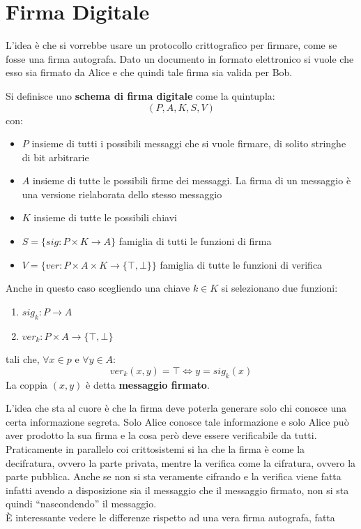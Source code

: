 \documentclass[a4paper,12pt, oneside]{book}
\begin{document}
\section{Firma Digitale}
L'idea è che si vorrebbe usare un protocollo crittografico per firmare, come se
fosse una firma autografa. Dato un documento in formato elettronico si vuole che
esso sia firmato da Alice e che quindi tale firma sia valida per Bob.
\begin{definizione}
  Si definisce uno \textbf{schema di firma digitale} come la quintupla:
  \[(P,A,K,S,V)\]
  con:
  \begin{itemize}
    \item $P$ insieme di tutti i possibili messaggi che si vuole firmare, di
    solito stringhe di bit arbitrarie
    \item $A$ insieme di tutte le possibili firme dei messaggi. La firma di un
    messaggio è una versione rielaborata dello stesso messaggio
    \item $K$ insieme di tutte le possibili chiavi
    \item $S=\{sig:P\times K\to A\}$ famiglia di tutti le funzioni di firma
    \item $V=\{ver:P\times A\times K\to\{\top,\bot\}\}$ famiglia di tutte le
    funzioni di verifica
  \end{itemize}
  Anche in questo caso scegliendo una chiave $k\in K$ si selezionano due
  funzioni:
  \begin{enumerate}
    \item $sig_k:P\to A$
    \item $ver_k:P\times A\to\{\top,\bot\}$
  \end{enumerate}
  tali che, $\forall x\in p$ e $\forall y\in A$:
  \[ver_k(x,y)=\top \iff y=sig_k(x)\]
  La coppia $(x,y)$ è detta \textbf{messaggio firmato}.
\end{definizione}
L'idea che sta al cuore è che la firma deve poterla generare solo chi conosce
una certa informazione segreta. Solo Alice conosce tale informazione e solo
Alice può aver prodotto la sua firma e la cosa però deve essere verificabile da
tutti. Praticamente in parallelo coi crittosistemi si ha che la firma è come la
decifratura, ovvero la parte privata, mentre la verifica come la cifratura,
ovvero la parte pubblica. Anche se non si sta veramente cifrando e la verifica
viene fatta infatti avendo a disposizione sia il messaggio che il messaggio
firmato, non si sta quindi ``nascondendo'' il messaggio.\\  
È interessante vedere le differenze rispetto ad una vera firma autografa, fatta
\end{document}
